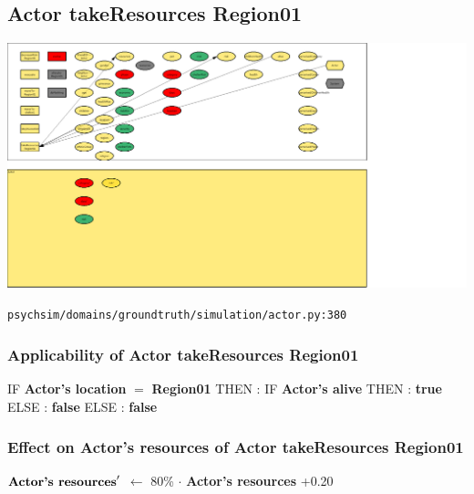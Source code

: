 \documentclass{article}%
\begin{document}
%
\subsection{Actor takeResources Region01}%
\label{subsec:Actor takeResources Region01}%
\includegraphics[width=\textwidth]{images/Actor-takeResources-Region01.png}%
\begin{flushleft}%
\verb|psychsim/domains/groundtruth/simulation/actor.py:380|%
\end{flushleft}%
\subsubsection{Applicability of Actor takeResources Region01}%
\label{ssubsec:Applicability of Actor takeResources Region01}%
\begin{flushleft}%
IF %
\textbf{Actor's location}%
$=$%
\textbf{Region01}%
\linebreak%
\hspace*{2em}%
THEN %
: %
IF %
\textbf{Actor's alive}%
\linebreak%
\hspace*{4em}%
THEN %
: %
\textbf{true}%
\linebreak%
\hspace*{4em}%
ELSE %
: %
\textbf{false}%
\linebreak%
\hspace*{2em}%
ELSE %
: %
\textbf{false}%
\end{flushleft}

%
\subsubsection{Effect on Actor's resources of Actor takeResources Region01}%
\label{ssubsec:Effect on Actor's resources of Actor takeResources Region01}%
\begin{flushleft}%
$\mbox{\textbf{Actor's resources}} '$%
$\leftarrow$%
80\%%
$\cdot$%
\textbf{Actor's resources}%
+0.20%
\end{flushleft}
\end{document}
